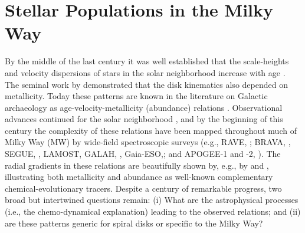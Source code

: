 \section{Stellar Populations in the Milky Way}

By the middle of the last century it was well established that the
scale-heights and velocity dispersions of stars in the solar
neighborhood increase with age \citep[see][for a summary of this early
  work, particularly the chapters contributed by Elvius and
  Delhaye]{Blaauw65}. The seminal work by \citet{Roman50} demonstrated
that the disk kinematics also depended on metallicity.  Today these
patterns are known in the literature on Galactic archaeology as
age-velocity-metallicity (abundance) relations \citep[AVM$\alpha$-R;
  e.g.,][]{Aumer09,Minchev14}. Observational advances continued for
the solar neighborhood \citep[e.g.,][]{Edvardsson93, Dehnen98,
  Nordstrom04}, and by the beginning of this century the complexity of
these relations have been mapped throughout much of Milky Way (MW) by
wide-field spectroscopic surveys (e.g., RAVE, \citealt{steinmetz06a};
BRAVA, \citealt{howard08a}, SEGUE, \citealt{yanny09a}, LAMOST,
\citealt{zhao12a} GALAH, \citealt{desilva15a},
Gaia-ESO,\citealt{gilmore12a}; and APOGEE-1 and -2,
\citealt{Majewski15}). The radial gradients in these relations are
beautifully shown by, e.g., by \citet{Bovy12c} and \citet{Hayden15},
illustrating both metallicity and abundance as well-known
complementary chemical-evolutionary tracers. Despite a century of
remarkable progress, two broad but intertwined questions remain: (i)
What are the astrophysical processes (i.e., the chemo-dynamical
explanation) leading to the observed relations; and (ii) are these
patterns generic for spiral disks or specific to the Milky Way?

